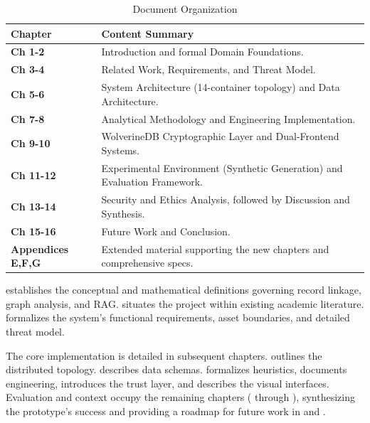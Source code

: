 \begin{table}[h]
\centering
\begin{tabular}{p{} p{}}
\toprule
\textbf{Chapter} & \textbf{Content Summary} \\
\midrule
\textbf{Ch 1-2} & Introduction and formal Domain Foundations. \\
\textbf{Ch 3-4} & Related Work, Requirements, and Threat Model. \\
\textbf{Ch 5-6} & System Architecture (14-container topology) and Data Architecture. \\
\textbf{Ch 7-8} & Analytical Methodology and Engineering Implementation. \\
\textbf{Ch 9-10} & WolverineDB Cryptographic Layer and Dual-Frontend Systems. \\
\textbf{Ch 11-12} & Experimental Environment (Synthetic Generation) and Evaluation Framework. \\
\textbf{Ch 13-14} & Security and Ethics Analysis, followed by Discussion and Synthesis. \\
\textbf{Ch 15-16} & Future Work and Conclusion. \\
\textbf{Appendices E,F,G} & Extended material supporting the new chapters and comprehensive specs. \\
\bottomrule
\end{tabular}
\caption{Document Organization}
\label{tab:doc-organization}
\end{table}

 establishes the conceptual and mathematical definitions governing record linkage, graph analysis, and RAG.  situates the project within existing academic literature.  formalizes the system's functional requirements, asset boundaries, and detailed threat model. 

The core implementation is detailed in subsequent chapters.  outlines the distributed topology.  describes data schemas.  formalizes heuristics,  documents engineering,  introduces the trust layer, and  describes the visual interfaces. Evaluation and context occupy the remaining chapters ( through ), synthesizing the prototype's success and providing a roadmap for future work in  and .
